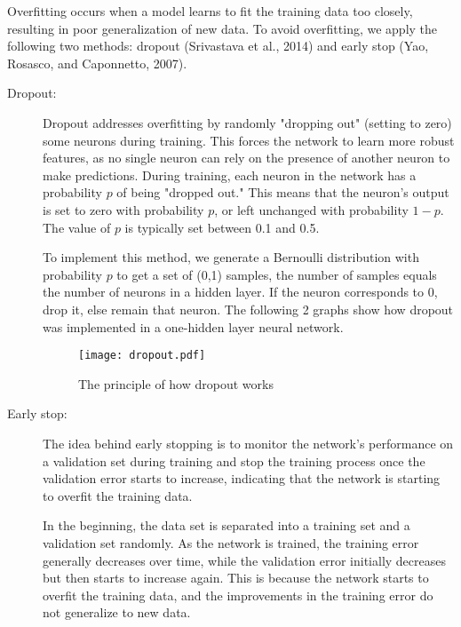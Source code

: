 Overfitting occurs when a model learns to fit the training data too closely, resulting in poor generalization of new data. To avoid overfitting, we apply the following two methods: dropout (Srivastava et al., 2014) and early stop (Yao, Rosasco, and Caponnetto, 2007).
\begin{description}
\item[Dropout:]Dropout addresses overfitting by randomly "dropping out" (setting to zero) some neurons during training. This forces the network to learn more robust features, as no single neuron can rely on the presence of another neuron to make predictions. During training, each neuron in the network has a probability $p$ of being "dropped out." This means that the neuron's output is set to zero with probability $p$, or left unchanged with probability $1-p$. The value of $p$ is typically set between 0.1 and 0.5.

To implement this method, we generate a Bernoulli distribution with probability $p$ to get a set of (0,1) samples, the number of samples equals the number of neurons in a hidden layer. If the neuron corresponds to 0, drop it, else remain that neuron. The following 2 graphs show how dropout was implemented in a one-hidden layer neural network.
\begin{figure}[H] %
\centering %
\texttt{[image: dropout.pdf]} %
\caption{The principle of how dropout works} %
\label{fig:dropout} %
\end{figure}
\item[Early stop:]The idea behind early stopping is to monitor the network's performance on a validation set during training and stop the training process once the validation error starts to increase, indicating that the network is starting to overfit the training data.


In the beginning, the data set is separated into a training set and a validation set randomly. As the network is trained, the training error generally decreases over time, while the validation error initially decreases but then starts to increase again. This is because the network starts to overfit the training data, and the improvements in the training error do not generalize to new data.


\end{description}
